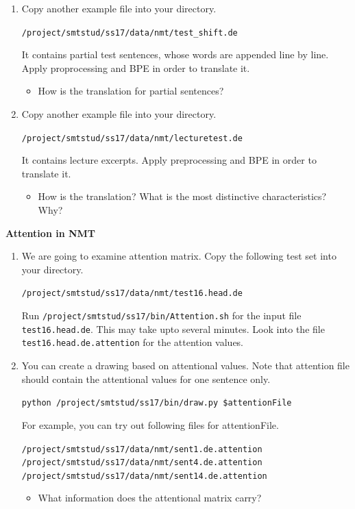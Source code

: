 \documentclass[12pt,fleqn]{article}
\begin{document}
\begin{enumerate} 
\item Copy another example file into your directory. 

\texttt{/project/smtstud/ss17/data/nmt/test\_shift.de} 

It contains partial test sentences, whose words are appended line by line. Apply proprocessing and BPE in order to translate it. 

\begin{itemize} 
\item How is the translation for partial sentences? 
\end{itemize} 



\item Copy another example file into your directory. 

\texttt{/project/smtstud/ss17/data/nmt/lecturetest.de} 

It contains lecture excerpts. Apply preprocessing and BPE in order to translate it. 

\begin{itemize} 
 \item How is the translation? What is the most distinctive characteristics? Why? 
\end{itemize}

\end{enumerate}
\newpage
\textbf{Attention in NMT} \\ 
\begin{enumerate} 
 \item We are going to examine attention matrix. Copy the following test set into your directory. 
 
 \texttt{/project/smtstud/ss17/data/nmt/test16.head.de} 
 
 Run \texttt{/project/smtstud/ss17/bin/Attention.sh} for the input file \texttt{test16.head.de}. This may take upto several minutes. Look into the file \texttt{test16.head.de.attention} for the attention values. 
 
 \item You can create a drawing based on attentional values. Note that attention file should contain the attentional values for one sentence only. 
 
 \texttt{python /project/smtstud/ss17/bin/draw.py \$attentionFile} 

 For example, you can try out following files for attentionFile. 
 
 \texttt{/project/smtstud/ss17/data/nmt/sent1.de.attention} \\ 
 \texttt{/project/smtstud/ss17/data/nmt/sent4.de.attention} \\ 
 \texttt{/project/smtstud/ss17/data/nmt/sent14.de.attention} 
 
 \begin{itemize} 
  \item What information does the attentional matrix carry? 
 \end{itemize}

 

 
\end{enumerate}


\end{document}
